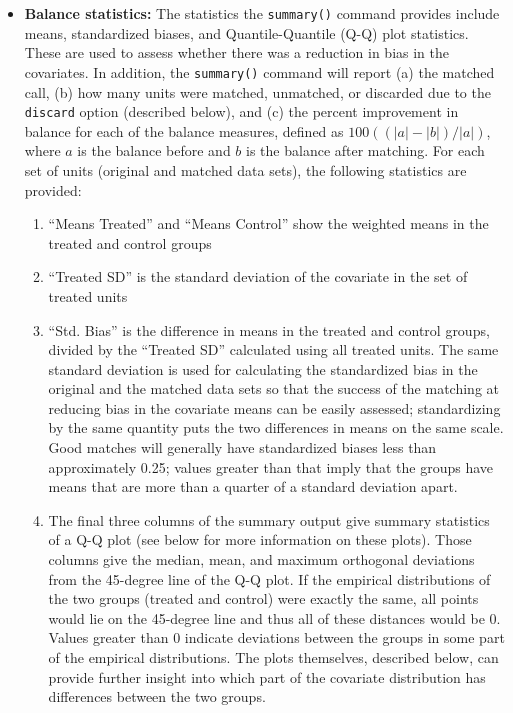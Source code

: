 \begin{itemize}
\item {\bf Balance statistics:} The statistics the \texttt{summary()}
  command provides include means, standardized biases, and
  Quantile-Quantile (Q-Q) plot statistics.  These are used to assess
  whether there was a reduction in bias in the covariates. In
  addition, the \texttt{summary()} command will report (a) the matched
  call, (b) how many units were matched, unmatched, or discarded due
  to the \texttt{discard} option (described below), and (c) the
  percent improvement in balance for each of the balance measures,
  defined as $100((|a|-|b|)/|a|)$, where $a$ is the balance before and
  $b$ is the balance after matching.  For each set of units (original
  and matched data sets), the following statistics are provided:
\begin{enumerate}
  \item ``Means Treated'' and ``Means Control'' show the weighted
    means in the treated and control groups
  \item ``Treated SD'' is the standard deviation of the covariate in
    the set of treated units
  \item ``Std. Bias'' is the difference in means in the treated and
    control groups, divided by the ``Treated SD'' calculated using all
    treated units.  The same standard deviation is used for
    calculating the standardized bias in the original and the matched
    data sets so that the success of the matching at reducing bias in
    the covariate means can be easily assessed; standardizing by the
    same quantity puts the two differences in means on the same scale.
    Good matches will generally have standardized biases less than
    approximately 0.25; values greater than that imply that the groups
    have means that are more than a quarter of a standard deviation
    apart.
  \item The final three columns of the summary output give summary
    statistics of a Q-Q plot (see below for more information on these
    plots). Those columns give the median, mean, and maximum
    orthogonal deviations from the 45-degree line of the Q-Q plot.  If
    the empirical distributions of the two groups (treated and
    control) were exactly the same, all points would lie on the
    45-degree line and thus all of these distances would be 0.  Values
    greater than 0 indicate deviations between the groups in some part
    of the empirical distributions.  The plots themselves, described
    below, can provide further insight into which part of the
    covariate distribution has differences between the two groups.
\end{enumerate}


\end{itemize}
